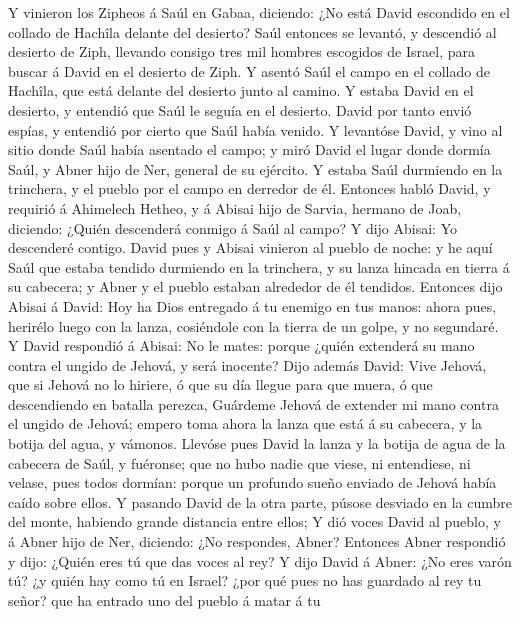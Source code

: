  Y vinieron los Zipheos á Saúl en Gabaa, diciendo: ¿No está
David escondido en el collado de Hachîla delante del desierto?
 Saúl entonces se levantó, y descendió al desierto de Ziph,
llevando consigo tres mil hombres escogidos de Israel, para buscar á
David en el desierto de Ziph.  Y asentó Saúl el campo en el
collado de Hachîla, que está delante del desierto junto al camino. Y
estaba David en el desierto, y entendió que Saúl le seguía en el
desierto.  David por tanto envió espías, y entendió por
cierto que Saúl había venido.  Y levantóse David, y vino al
sitio donde Saúl había asentado el campo; y miró David el lugar donde
dormía Saúl, y Abner hijo de Ner, general de su ejército. Y estaba Saúl
durmiendo en la trinchera, y el pueblo por el campo en derredor de él.
 Entonces habló David, y requirió á Ahimelech Hetheo, y á
Abisai hijo de Sarvia, hermano de Joab, diciendo: ¿Quién descenderá
conmigo á Saúl al campo? Y dijo Abisai: Yo descenderé contigo.
 David pues y Abisai vinieron al pueblo de noche: y he aquí
Saúl que estaba tendido durmiendo en la trinchera, y su lanza hincada en
tierra á su cabecera; y Abner y el pueblo estaban alrededor de él
tendidos.  Entonces dijo Abisai á David: Hoy ha Dios
entregado á tu enemigo en tus manos: ahora pues, herirélo luego con la
lanza, cosiéndole con la tierra de un golpe, y no segundaré.
 Y David respondió á Abisai: No le mates: porque ¿quién
extenderá su mano contra el ungido de Jehová, y será inocente?
 Dijo además David: Vive Jehová, que si Jehová no lo
hiriere, ó que su día llegue para que muera, ó que descendiendo en
batalla perezca,  Guárdeme Jehová de extender mi mano
contra el ungido de Jehová; empero toma ahora la lanza que está á su
cabecera, y la botija del agua, y vámonos.  Llevóse pues
David la lanza y la botija de agua de la cabecera de Saúl, y fuéronse;
que no hubo nadie que viese, ni entendiese, ni velase, pues todos
dormían: porque un profundo sueño enviado de Jehová había caído sobre
ellos.  Y pasando David de la otra parte, púsose desviado
en la cumbre del monte, habiendo grande distancia entre ellos;
 Y dió voces David al pueblo, y á Abner hijo de Ner,
diciendo: ¿No respondes, Abner? Entonces Abner respondió y dijo: ¿Quién
eres tú que das voces al rey?  Y dijo David á Abner: ¿No
eres varón tú? ¿y quién hay como tú en Israel? ¿por qué pues no has
guardado al rey tu señor? que ha entrado uno del pueblo á matar á tu
